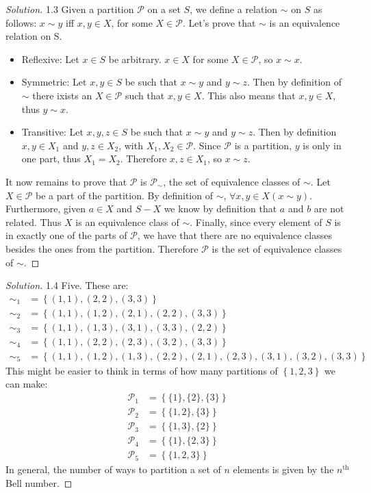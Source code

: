 \documentclass{article}
\theoremstyle{definition}
\newcommand{\PS}{\mathcal{P}}
\newcommand{\set}[1]{\left\{#1\right\}}
\theoremstyle{definition}
\newenvironment{solution}{%
  \begin{proof}[Solution]
  \vspace{-8px}
  \setlength{\parskip}{4px}
  \setlength{\parindent}{0px}
}{
  \end{proof}
}
\begin{document}
\begin{solution}
1.3 Given a partition $\mathcal{P}$ on a set $S$, we define a relation $\sim$ on
$S$ as follows: $x \sim y$ iff $x, y \in X$, for some $X \in \mathcal{P}$.
Let's prove that $\sim$ is an equivalence relation on S.
\begin{itemize}
  \item Reflexive: Let $x \in S$ be arbitrary. $x \in X$ for some $X \in
    \mathcal{P}$, so $x \sim x$.
  \item Symmetric: Let $x, y \in S$ be such that $x \sim y$ and $y \sim z$.
Then by definition of $\sim$ there ixists an $X \in \PS$ such that $x, y \in X$.
This also means that $x, y \in X$, thus $y \sim x$.
  \item Transitive: Let $x, y, z \in S$ be such that $x \sim y$ and $y \sim z$.
Then by definition $x, y \in X_1$ and $y,z \in X_2$, with $X_1, X_2 \in \PS$.
Since $\PS$ is a partition, $y$ is only in one part, thus $X_1 = X_2$. Therefore
$x, z \in X_1$, so $x \sim z$.
\end{itemize}
It now remains to prove that $\PS$ is $\PS_{\sim}$, the set of equivalence classes of $\sim$. Let $X \in \PS$ be a part of the partition. By definition of $\sim$, $\forall x, y \in X (x \sim y)$. Furthermore, given $a \in X$ and $S - X$ we know by definition that $a$ and $b$ are not related. Thus $X$ is an equivalence class of $\sim$. Finally, since every element of $S$ is in exactly one of the parts of $\PS$, we have that there are no equivalence classes besides the ones from the partition. Therefore $\PS$ is the set of equivalence classes of $\sim$.
\end{solution}

\begin{solution}
1.4 Five. These are:
\begin{align*}
  \sim_1 &= \set{(1,1), (2,2), (3,3)} \\
  \sim_2 &= \set{(1,1), (1,2), (2,1), (2,2), (3,3)} \\
  \sim_3 &= \set{(1,1), (1,3), (3,1), (3,3), (2,2)} \\
  \sim_4 &= \set{(1,1), (2,2), (2,3), (3,2), (3,3)} \\
  \sim_5 &= \set{(1,1), (1,2), (1,3), (2,2), (2,1), (2,3), (3,1), (3,2), (3,3)}
\end{align*}
This might be easier to think in terms of how many partitions of $\set{1,2,3}$ we can make:
\begin{align*}
  \PS_1 &= \set{\{1\}, \{2\}, \{3\}} \\
  \PS_2 &= \set{\{1, 2\}, \{3\}} \\
  \PS_3 &= \set{\{1, 3\}, \{2\}} \\
  \PS_4 &= \set{\{1\}, \{2, 3\}} \\
  \PS_5 &= \set{\{1, 2, 3\}}
\end{align*}
In general, the number of ways to partition a set of $n$ elements is given by the $n^{\text{th}}$ Bell number.
\end{solution}
\end{document}
